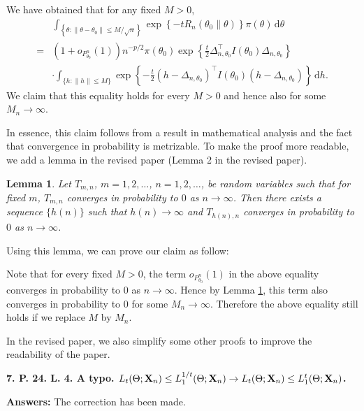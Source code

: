 \documentclass[11pt]{article}
\theoremstyle{plain}
\newtheorem*{lemma}{\quad\quad Lemma}
\theoremstyle{definition}
\theoremstyle{remark}
\begin{document}
We have obtained that for any fixed $M>0$, 
    \begin{align*}
    & \int_{\left\{ \theta: \|\theta - \theta_0\| \leq M/\sqrt n \right\} }
    \exp \left\{-t R_n(\theta_0\| \theta) \right\} \pi(\theta)
    \, \mathrm d \theta
        \\
        =&
        (1+o_{P^n_{\theta_0}}(1))
        n^{-p/2}\pi(\theta_0)
        \exp\left\{ 
                \frac{t}{2}\Delta_{n,\theta_0}^\top  I({\theta_0})\Delta_{n,\theta_0}
        \right\}
        \\
        &
        \cdot
        \int_{\{h:\|h\|\leq M\}}\exp\left\{ -\frac{t}{2}(h-\Delta_{n,\theta_0})^\top  I({\theta_0})(h-\Delta_{n,\theta_0})\right\} \, \mathrm dh
        .
\end{align*}
We claim that this equality holds for every $M>0$ and hence also for some $M_n \to \infty$.

In essence, this claim follows from a result in mathematical analysis and the fact that convergence in probability is metrizable.
To make the proof more readable, we add a lemma in the revised paper (Lemma 2 in the revised paper).
\begin{lemma}
        Let $T_{m,n}$, $m = 1, 2,\dots$, $n = 1, 2,\dots$, be random variables such that for fixed $m$, $T_{m,n}$ converges in probability to $0$ as $n \to \infty$.
        Then there exists a sequence $\{h(n)\}$ such that $h(n) \to \infty$ and $T_{h(n), n}$ converges in probability to $0$ as $n \to \infty$.
        \label{lemma:MN}
\end{lemma}
Using this lemma, we can prove our claim as follow:

Note that for every fixed $M > 0$, the term $o_{P_{\theta_0}^n}(1)$ in the above equality converges in probability to $0$ as $n \to \infty$.
Hence by Lemma \ref{lemma:MN}, this term also converges in probability to $0$ for some $M_n \to \infty$.
Therefore the above equality still holds if we replace $M$ by $M_n$.

In the revised paper, we also simplify some other proofs to improve the readability of the paper.

\textbf{
7.
P. 24. L. 4.
A typo.
$L_t (\Theta ; \mathbf{X}_n) \leq L_1^{1/t}(\Theta ; \mathbf{X}_n) \rightarrow  L_t (\Theta ; \mathbf{X}_n) \leq L_1^{t}(\Theta ; \mathbf{X}_n) $.
}


\textbf{Answers:}
The correction has been made.
\end{document}
